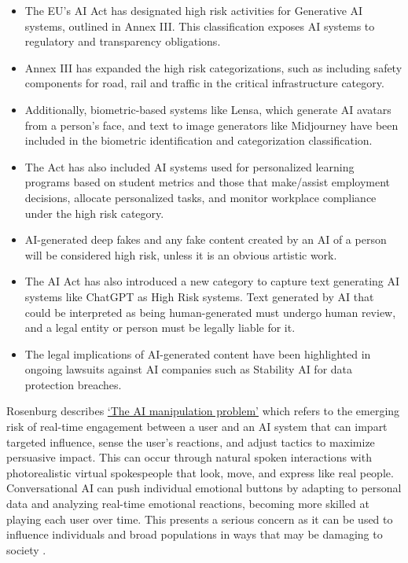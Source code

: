 \begin{itemize}
\item The EU's AI Act has designated high risk activities for Generative AI systems, outlined in Annex III. This classification exposes AI systems to regulatory and transparency obligations.
\item Annex III has expanded the high risk categorizations, such as including safety components for road, rail and traffic in the critical infrastructure category.
\item Additionally, biometric-based systems like Lensa, which generate AI avatars from a person's face, and text to image generators like Midjourney have been included in the biometric identification and categorization classification.
\item The Act has also included AI systems used for personalized learning programs based on student metrics and those that make/assist employment decisions, allocate personalized tasks, and monitor workplace compliance under the high risk category.
\item AI-generated deep fakes and any fake content created by an AI of a person will be considered high risk, unless it is an obvious artistic work.
\item The AI Act has also introduced a new category to capture text generating AI systems like ChatGPT as High Risk systems. Text generated by AI that could be interpreted as being human-generated must undergo human review, and a legal entity or person must be legally liable for it.
\item The legal implications of AI-generated content have been highlighted in ongoing lawsuits against AI companies such as Stability AI for data protection breaches.
\end{itemize}
Rosenburg describes \href{https://bigthink.com/the-present/danger-conversational-ai/}{`The AI manipulation problem'} which refers to the emerging risk of real-time engagement between a user and an AI system that can impart targeted influence, sense the user's reactions, and adjust tactics to maximize persuasive impact. This can occur through natural spoken interactions with photorealistic virtual spokespeople that look, move, and express like real people. Conversational AI can push individual emotional buttons by adapting to personal data and analyzing real-time emotional reactions, becoming more skilled at playing each user over time. This presents a serious concern as it can be used to influence individuals and broad populations in ways that may be damaging to society \cite{Rosenberg2023}.

